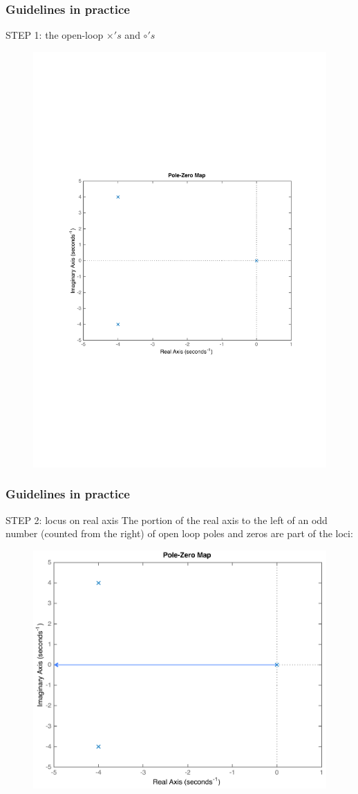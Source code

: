 \begin{frame}
\frametitle{Guidelines in practice}
	\begin{block}{STEP 1: the open-loop $\times's$ and $\circ's$}
		\begin{figure}
			\centering
			\includegraphics[width=0.6\linewidth]{how_to_draw_ex1}
		\end{figure}
	\end{block}
\end{frame}

\begin{frame}
\frametitle{Guidelines in practice}
	\begin{block}{STEP 2: locus on real axis}
		The portion of the real axis to the left of an odd number (counted from the right) of open loop poles and zeros are part of the loci:
		\vspace{-0.5em}
		\begin{figure}
			\centering
			\includegraphics[width=0.5\linewidth]{how_to_draw_ex2}
		\end{figure}
	\end{block}
\end{frame}


